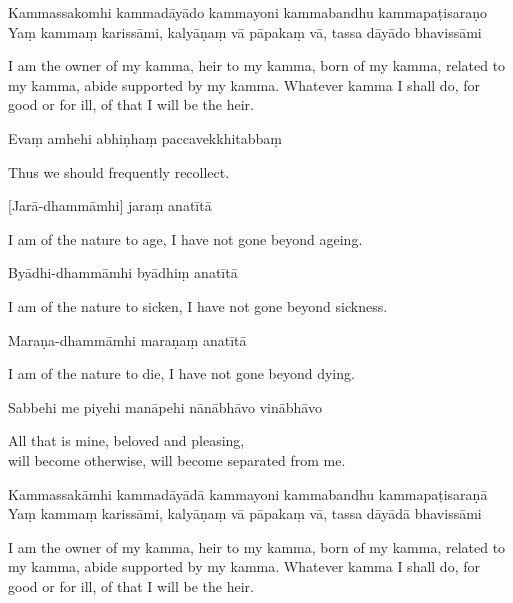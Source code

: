 Kammassakomhi kammadāyādo kammayoni kammabandhu kammapaṭisaraṇo\\
Yaṃ kammaṃ karissāmi, kalyāṇaṃ vā pāpakaṃ vā, tassa dāyādo bhavissāmi

\begin{english}
  I am the owner of my kamma, heir to my kamma, born of my kamma, related to my
  kamma, abide supported by my kamma. Whatever kamma I shall do, for good or for
  ill, of that I will be the heir.
\end{english}

Evaṃ amhehi abhiṇhaṃ paccavekkhitabbaṃ

\begin{english}
  Thus we should frequently recollect.
\end{english}


[Jarā-dhammāmhi] jaraṃ anatītā

\begin{english}
  I am of the nature to age, I have not gone beyond ageing.
\end{english}

Byādhi-dhammāmhi byādhiṃ anatītā

\begin{english}
  I am of the nature to sicken, I have not gone beyond sickness.
\end{english}

Maraṇa-dhammāmhi maraṇaṃ anatītā

\begin{english}
  I am of the nature to die, I have not gone beyond dying.
\end{english}

Sabbehi me piyehi manāpehi nānābhāvo vinābhāvo

\begin{english}
  All that is mine, beloved and pleasing,\\
  will become otherwise, will become separated from me.
\end{english}

Kammassakāmhi kammadāyādā kammayoni kammabandhu kammapaṭisaraṇā\\
Yaṃ kammaṃ karissāmi, kalyāṇaṃ vā pāpakaṃ vā, tassa dāyādā bhavissāmi

\begin{english}
  I am the owner of my kamma, heir to my kamma, born of my kamma, related to my
  kamma, abide supported by my kamma. Whatever kamma I shall do, for good or for
  ill, of that I will be the heir.
\end{english}

